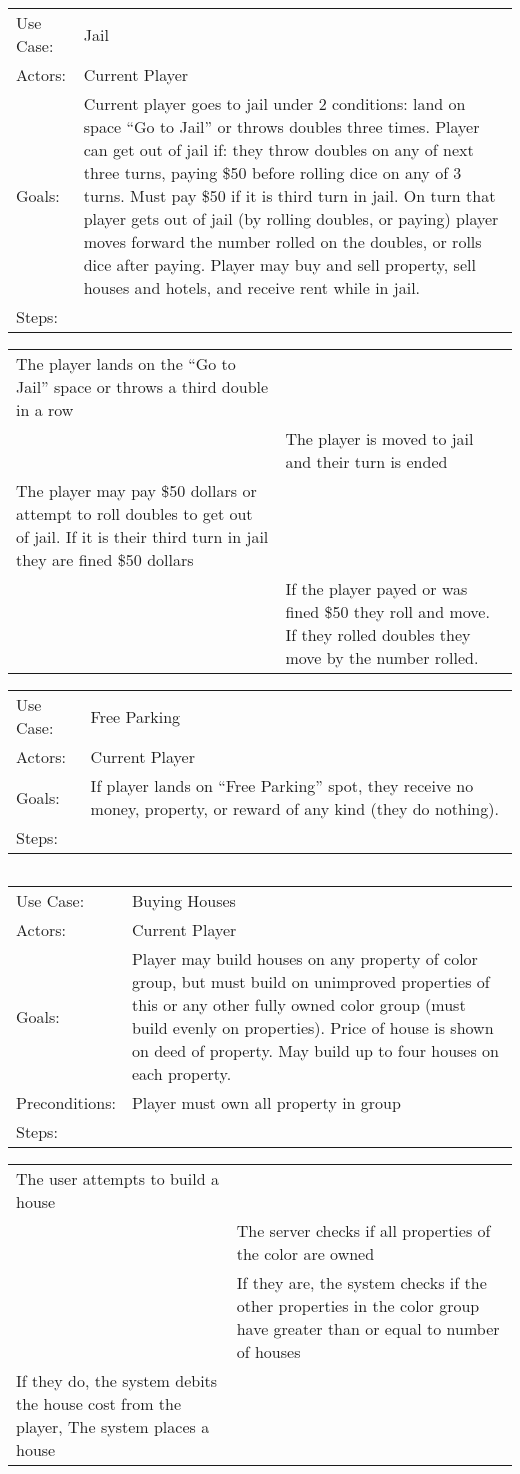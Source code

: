 \documentclass[10pt,letterpaper]{article}
\newcommand{\usecasetwocol}[1]{
\begin{center}
	\begin{tabularx}{0.8\textwidth}{| X X |}
		\hline
		#1 \\
		\hline
	\end{tabularx}
\end{center}
}
\newcommand{\usecasedescription}[1]{
\begin{center}
	\begin{tabularx}{0.8\textwidth}{X X}
		#1
	\end{tabularx}
\end{center}
}
\newcommand{\usecase}[2]{
\usecasedescription{#1}
\usecasetwocol{#2}
}
\begin{document}
\usecase{Use Case: & Jail \\
	Actors: & Current Player \\
	Goals: & Current player goes to jail under 2 conditions: land on space “Go to Jail” or throws doubles three times. Player can get out of jail if: they throw doubles on any of next three  turns, paying \$50 before rolling dice on any of 3 turns. Must pay \$50 if it is third turn in  jail. On turn that player gets out of jail (by rolling doubles, or paying) player moves  forward the number rolled on the doubles, or rolls dice after paying. Player may buy and  sell property, sell houses and hotels, and receive rent while in jail. \\
	Steps: &  }{The player lands on the “Go to Jail” space or throws a third double in a row& \\
	&The player is moved to jail and their turn is ended \\
	The player may pay \$50 dollars or attempt to roll doubles to get out of jail. If it is their third turn in jail they are fined \$50 dollars &\\
	&If the player payed or was fined \$50 they roll and move. If they rolled doubles they move by the number rolled.}

\usecase{Use Case: & Free Parking \\
	Actors: & Current Player \\
	Goals: & If player lands on “Free Parking” spot, they receive no money, property, or reward of any kind (they do nothing). \\
	Steps: &  }{&}

\usecase{Use Case: & Buying Houses \\
	Actors: & Current Player \\
	Goals: & Player may build houses on any property of color group, but must build on unimproved  properties of this or any other fully owned color group (must build evenly on properties). Price of house is shown on deed of property. May build up to four houses on each property. \\
	Preconditions: & Player must own all property in group \\
	Steps: &  }{The user attempts to build a house &\\
	&The server checks if all properties of the color are owned \\
	&If they are, the system checks if the other properties in the color group have greater than or equal to number of houses \\
	If they do, the system debits the house cost from the player, The system places a house&}
\end{document}
